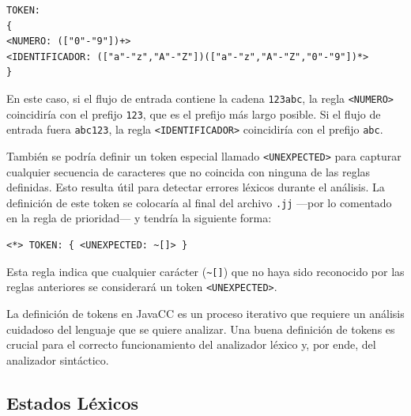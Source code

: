 \lstset{inputencoding=utf8/latin1}
\begin{lstlisting}
TOKEN:
{
<NUMERO: (["0"-"9"])+>
<IDENTIFICADOR: (["a"-"z","A"-"Z"])(["a"-"z","A"-"Z","0"-"9"])*>
}
\end{lstlisting}

En este caso, si el flujo de entrada contiene la cadena \lstinline|123abc|, la regla \lstinline|<NUMERO>| coincidiría con el prefijo \lstinline|123|, que es el prefijo más largo posible. Si el flujo de entrada fuera \lstinline|abc123|, la regla \lstinline|<IDENTIFICADOR>| coincidiría con el prefijo \lstinline|abc|.

También se podría definir un token especial llamado \lstinline|<UNEXPECTED>| para capturar cualquier secuencia de caracteres que no coincida con ninguna de las reglas definidas. Esto resulta útil para detectar errores léxicos durante el análisis. La definición de este token se colocaría al final del archivo \lstinline|.jj| ---por lo comentado en la regla de prioridad--- y tendría la siguiente forma:

\lstset{inputencoding=utf8/latin1}
\begin{lstlisting}
<*> TOKEN: { <UNEXPECTED: ~[]> }
\end{lstlisting}

Esta regla indica que cualquier carácter (\lstinline{~[]}) que no haya sido reconocido por las reglas anteriores se considerará un token \lstinline{<UNEXPECTED>}.

La definición de tokens en JavaCC es un proceso iterativo que requiere un análisis cuidadoso del lenguaje que se quiere analizar. Una buena definición de tokens es crucial para el correcto funcionamiento del analizador léxico y, por ende, del analizador sintáctico.

\subsection{Estados Léxicos}


